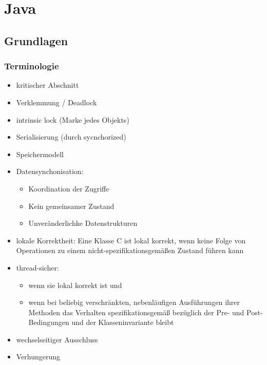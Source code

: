 \section{Java}
\subsection{Grundlagen}
\subsubsection{Terminologie}
\begin{itemize}
	\item kritischer Abschnitt
	\item Verklemmung / Deadlock
	\item intrinsic lock (Marke jedes Objekts)
	\item Serialisierung (durch sycnchorized)
	\item Speichermodell
	\item Datensynchonisation: 
		\begin{itemize} 
			\item Koordination der Zugriffe
			\item Kein gemeinsamer Zustand
			\item Unveränderlichke Datenstrukturen
		\end{itemize}
	\item lokale Korrektheit: Eine Klasse C ist lokal korrekt, wenn keine Folge von Operationen zu einem nicht-spezifikationsgemäßen Zustand führen kann
	\item thread-sicher:
		\begin{itemize}
			\item wenn sie lokal korrekt ist und
			\item wenn bei beliebig verschränkten, nebenläufigen Ausführungen ihrer Methoden das Verhalten spezifikationsgemäß bezüglich der Pre- und Post-Bedingungen und der Klasseninvariante bleibt
		\end{itemize}
	\item wechselseitiger Ausschluss
	\item Verhungerung
\end{itemize}
